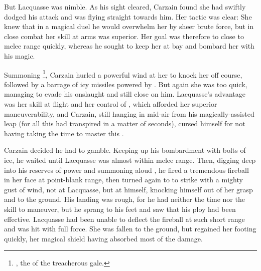 But Lacquasse was nimble. As his sight cleared, Carzain found she had swiftly dodged his attack and was flying straight towards him. Her tactic was clear: She knew that in a magical duel he would overwhelm her by sheer brute force, but in close combat her skill at arms was superior. Her goal was therefore to close to melee range quickly, whereas he sought to keep her at bay and bombard her with his magic. 


Summoning \Iphicoss{}\footnote{\Iphicoss{}, the \Kliffah{} of the treacherous gale.}, Carzain hurled a powerful wind at her to knock her off course, followed by a barrage of icy missiles powered by \Horvaleth{}. But again she was too quick, managing to evade his onslaught and still close on him. Lacquasse's advantage was her skill at flight and her control of \Feazin{}, which afforded her superior maneuverability, and Carzain, still hanging in mid-air from his magically-assisted leap (for all this had transpired in a matter of seconds), cursed himself for not having taking the time to master this \Sephirah{}. 


Carzain decided he had to gamble. Keeping up his bombardment with bolts of ice, he waited until Lacquasse was almost within melee range. Then, digging deep into his reserves of power and summoning aloud \Izion{}, he fired a tremendous fireball in her face at point-blank range, then turned again to \Iphicoss{} to strike with a mighty gust of wind, not at Lacquasse, but at himself, knocking himself out of her grasp and to the ground. His landing was rough, for he had neither the time nor the skill to maneuver, but he sprang to his feet and saw that his ploy had been effective. Lacquasse had been unable to deflect the fireball at such short range and was hit with full force. She was fallen to the ground, but regained her footing quickly, her magical shield having absorbed most of the damage. 

